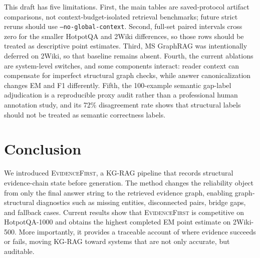 \documentclass[runningheads]{llncs}
\newcommand{\sys}{\textsc{EvidenceFirst}\xspace}
\begin{document}
This draft has five limitations. First, the main tables are saved-protocol
artifact comparisons, not context-budget-isolated retrieval benchmarks; future
strict reruns should use \texttt{--no-global-context}. Second, full-set paired
intervals cross zero for the smaller HotpotQA and 2Wiki differences, so those
rows should be treated as descriptive point estimates. Third, MS GraphRAG was
intentionally deferred on 2Wiki, so that baseline remains absent. Fourth, the
current ablations are system-level switches, and some components interact:
reader context can compensate for imperfect structural graph checks, while
answer canonicalization changes EM and F1 differently. Fifth, the 100-example
semantic gap-label adjudication is a reproducible proxy audit rather than a
professional human annotation study, and its 72\% disagreement rate shows that
structural labels should not be treated as semantic correctness labels.

\section{Conclusion}
\label{sec:conclusion}

We introduced \sys, a KG-RAG pipeline that records structural evidence-chain
state before generation. The method changes the reliability object from only the
final answer string to the retrieved evidence graph, enabling graph-structural
diagnostics such as missing entities, disconnected pairs, bridge gaps, and
fallback cases. Current results show that \sys is competitive on HotpotQA-1000
and obtains the highest completed EM point estimate on 2Wiki-500. More
importantly, it provides a traceable account of where evidence succeeds or
fails, moving KG-RAG toward systems that are not only accurate, but auditable.



\end{document}
